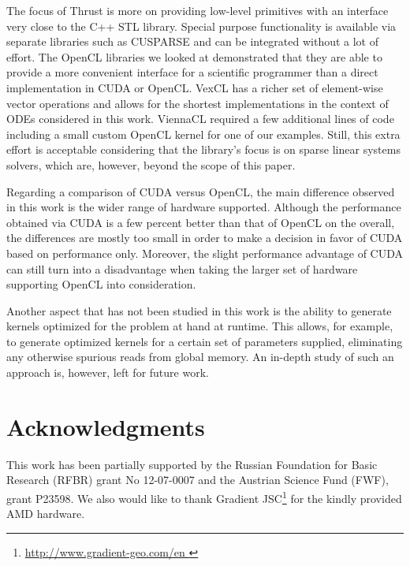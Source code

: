 \documentclass[final]{siamltex}
\begin{document}
The focus of Thrust is more on providing low-level primitives with an interface
very close to the C++ STL library.  Special purpose functionality is available
via separate libraries such as CUSPARSE and can be integrated without a lot of
effort.  The OpenCL libraries we looked at demonstrated that they are able to
provide a more convenient interface for a scientific programmer than a direct
implementation in CUDA or OpenCL.  VexCL has a richer set of element-wise
vector operations and allows for the shortest implementations in the context of
ODEs considered in this work.  ViennaCL required a few additional lines of code
including a small custom OpenCL kernel for one of our examples.  Still, this extra
effort is acceptable considering that the library's focus is on sparse linear
systems solvers, which are, however, beyond the scope of this paper.

Regarding a comparison of CUDA versus OpenCL, the main difference observed in
this work is the wider range of hardware supported.  Although the performance
obtained via CUDA is a few percent better than that of OpenCL on the overall,
the differences are mostly too small in order to make a decision in favor of
CUDA based on performance only.  Moreover, the slight performance advantage of
CUDA can still turn into a disadvantage when taking the larger set of hardware
supporting OpenCL into consideration.


Another aspect that has not been studied in this work is the ability to
generate kernels optimized for the problem at hand at runtime. This allows, for
example, to generate optimized kernels for a certain set of parameters
supplied, eliminating any otherwise spurious reads from global memory.  An
in-depth study of such an approach is, however, left for future work.

\section{Acknowledgments}

This work has been partially supported by the Russian Foundation for Basic
Research (RFBR) grant No 12-07-0007 and the Austrian Science Fund (FWF), grant
P23598.  We also would like to thank Gradient JSC\footnote{ \href{
http://www.gradient-geo.com/en }{ http://www.gradient-geo.com/en } } for the
kindly provided AMD hardware.




\end{document}
